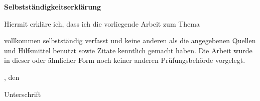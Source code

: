 \begin{center}
\textsf{\textbf{\large Selbstständigkeitserklärung}}
\end{center}
\noindent Hiermit erkläre ich, dass ich die vorliegende Arbeit zum Thema

\begin{center}
\textsf{\textbf{\docTitle}}
\end{center}

\noindent vollkommen selbstständig verfasst und keine anderen als die
angegebenen Quellen und Hilfsmittel benutzt sowie Zitate kenntlich gemacht
haben. Die Arbeit wurde in dieser oder ähnlicher Form noch keiner anderen
Prüfungsbehörde vorgelegt.
\vspace{3cm}

\noindent \docTown, den \docDate

\vspace{1.7cm}

\noindent Unterschrift